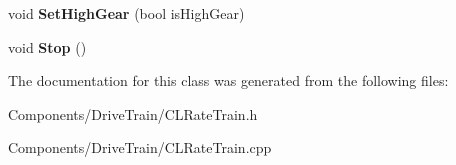 \begin{DoxyCompactItemize}
\item 
\hypertarget{class_closed_loop_rate_drivetrain_a46e77851bb839d5976092559b81c5890}{
void {\bfseries \-Set\-High\-Gear} (bool is\-High\-Gear)}
\label{class_closed_loop_rate_drivetrain_a46e77851bb839d5976092559b81c5890}

\item 
\hypertarget{class_closed_loop_rate_drivetrain_a99bc967f5d769454e044da313c888034}{
void {\bfseries \-Stop} ()}
\label{class_closed_loop_rate_drivetrain_a99bc967f5d769454e044da313c888034}

\end{DoxyCompactItemize}


\-The documentation for this class was generated from the following files\-:\begin{DoxyCompactItemize}
\item 
\-Components/\-Drive\-Train/\-C\-L\-Rate\-Train.\-h\item 
\-Components/\-Drive\-Train/\-C\-L\-Rate\-Train.\-cpp\end{DoxyCompactItemize}
